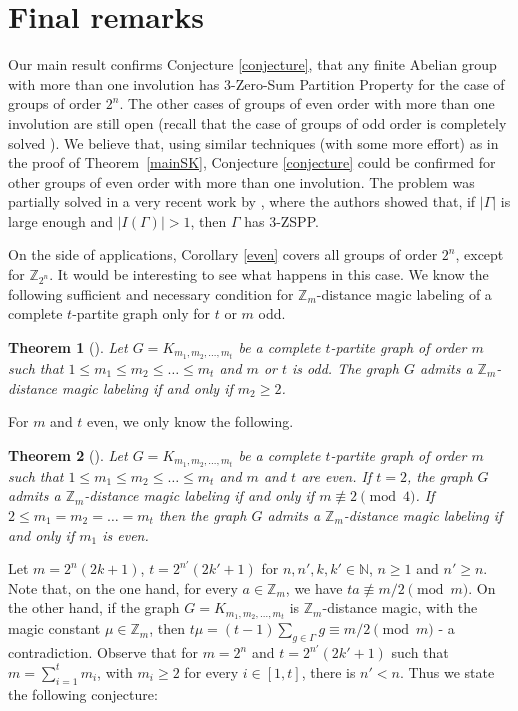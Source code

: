 \documentclass[final]{dmtcs-episciences}
\newtheorem{thm}{Theorem}[section]
\newcommand{\zet}{\mathbb{Z}}
\begin{document}
\section{Final remarks}\label{sec:final}
Our main result confirms Conjecture \ref{conjecture}, that any finite Abelian group with more than one involution has $3$-Zero-Sum Partition Property for the case of groups of order $2^n$. The other cases of groups of even order with more than one involution are still open (recall that the case of groups of odd order is completely solved \citep{Tannenbaum1,Zeng}). We believe that, using similar techniques (with some more effort) as in the proof of Theorem~\ref{mainSK}, Conjecture \ref{conjecture} could be confirmed for other groups of even order with more than one involution. The problem was partially solved in a very recent work by \citet{MP}, where the authors showed that, if $|\Gamma|$ is large enough and $|I(\Gamma)|>1$, then $\Gamma$ has $3$-ZSPP.

On the side of applications, Corollary \ref{even} covers all groups of order $2^n$, except for $\zet_{2^n}$. It would be interesting to see what happens in this case. We know the following sufficient and necessary condition for $\zet_m$-distance magic labeling of a complete $t$-partite graph only for $t$ or $m$ odd.

\begin{thm}[\citet{Cic3,FREYBERG2019}]
Let $G = K_{m_1,m_2,\ldots,m_t}$ be a complete $t$-partite graph of order $m$ such that\/ $ 1\leq m_1 \leq m_2 \leq\ldots\leq m_{t}$ and $m$ or $t$ is odd. The graph $G$ admits a $\zet_m$-distance magic labeling if and only if $m_2\geq 2$.
\end{thm}

For $m$ and $t$ even, we only know the following.
\begin{thm}[\citet{CichaczOM,CicZ}]
Let $G = K_{m_1,m_2,\ldots,m_t}$ be a complete $t$-partite graph of order $m$ such that $ 1\leq m_1 \leq m_2 \leq\ldots\leq m_{t}$ and $m$ and $t$ are even. If $t=2$, the graph $G$ admits a $\zet_m$-distance magic labeling if and only if $m\not\equiv2  \pmod 4$. If $ 2\leq m_1 = m_2 =\ldots=m_{t}$ then the graph $G$ admits a $\zet_m$-distance magic labeling if and only if $m_1$ is even. 
\end{thm}

Let $m=2^{n}(2k+1)$, $t=2^{n'}(2k'+1)$  for $n,n',k,k'\in \mathbb{N}$, $n\geq1$ and $n'\geq n$.
Note that, on the one hand, for every $a\in \zet_m$, we have $ta\not\equiv m/2\pmod m$. On the other hand, if the graph $G = K_{m_1,m_2,\ldots,m_t}$ is $\zet_m$-distance magic, with the magic constant $\mu\in\zet_m$, then $t\mu = (t-1)\sum_{g\in \Gamma}g \equiv m/2\pmod m$ - a contradiction. Observe that for $m=2^n$ and $t=2^{n'}(2k'+1)$ such that $m=\sum_{i=1}^{t}m_i$, with  $m_i\geq 2$ for every $i\in[1,t]$, there is $n'<n$. Thus we state the following conjecture:
\end{document}
